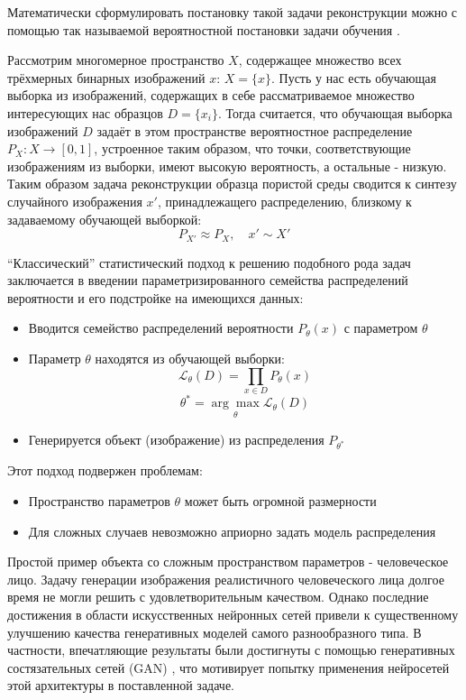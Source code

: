 	Математически сформулировать постановку такой задачи реконструкции можно с помощью так называемой вероятностной постановки задачи обучения \cite{Voron-ML, GAN-original}.
	
	Рассмотрим многомерное пространство $X$, содержащее множество всех трёхмерных бинарных изображений $x$: $X = \{x\}$. Пусть у нас есть обучающая выборка из изображений, содержащих в себе рассматриваемое множество интересующих нас образцов $D = \{x_i\}$. Тогда считается, что  обучающая выборка изображений $D$ задаёт в этом пространстве вероятностное распределение $P_X : X \longrightarrow [0,1]$, устроенное таким образом, что точки, соответствующие изображениям из выборки, имеют высокую вероятность, а остальные - низкую. Таким образом задача реконструкции образца пористой среды сводится к синтезу случайного изображения $x'$, принадлежащего распределению, близкому к задаваемому обучающей выборкой:
	$$ P_{X'} \approx P_X, \quad x' \sim X'$$
	
	``Классический'' статистический подход к решению подобного рода задач заключается в введении параметризированного семейства распределений вероятности и его подстройке на имеющихся данных:
	
	\begin{itemize}
		\item Вводится семейство распределений вероятности $P_{\theta}(x)$ с параметром $\theta$
		\item Параметр $\theta$ находятся из обучающей выборки:
		$$ \mathcal{L}_{\theta}(D) = \prod_{x \in D} P_{\theta}(x) $$
		$$ \theta^{*} = \underset{\theta}{\arg\max} \mathcal{L}_{\theta}(D)$$
		\item Генерируется объект (изображение) из распределения $ P_{\theta^{*}}$
	\end{itemize}
	
	Этот подход подвержен проблемам:
	
	\begin{itemize}
		\item Пространство параметров $\theta$ может быть огромной размерности
		\item Для сложных случаев невозможно априорно задать модель распределения
	\end{itemize}
	
	Простой пример объекта со сложным пространством параметров - человеческое лицо. Задачу генерации изображения реалистичного человеческого лица долгое время не могли решить с удовлетворительным качеством. Однако последние достижения в области искусственных нейронных сетей привели к существенному улучшению качества генеративных моделей самого разнообразного типа. В частности, впечатляющие результаты были достигнуты с помощью генеративных состязательных сетей (GAN) \cite{cGAN, cGAN-face, EBGAN, BEGAN}, что мотивирует попытку применения нейросетей этой архитектуры в поставленной задаче.
	
